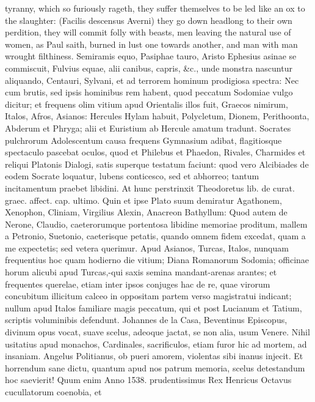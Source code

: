 {tyranny, which so furiously rageth, they suffer themselves to be led
like an ox to the slaughter: (Facilis descensus Averni) they go down
headlong to their own perdition, they will commit folly with beasts,
men leaving the natural use of women, as Paul saith, burned in
lust one towards another, and man with man wrought filthiness.
Semiramis equo, Pasiphae tauro, Aristo Ephesius asinae se commiscuit,
Fulvius equae, alii canibus, capris, \&c., unde monstra nascuntur
aliquando, Centauri, Sylvani, et ad terrorem hominum prodigiosa
spectra: Nec cum brutis, sed ipsis hominibus rem habent, quod peccatum
Sodomiae vulgo dicitur; et frequens olim vitium apud Orientalis illos
fuit, Graecos nimirum, Italos, Afros, Asianos: Hercules Hylam
habuit, Polycletum, Dionem, Perithoonta, Abderum et Phryga; alii et
Euristium ab Hercule amatum tradunt. Socrates pulchrorum Adolescentum
causa frequens Gymnasium adibat, flagitiosque spectaculo pascebat
oculos, quod et Philebus et Phaedon, Rivales, Charmides et
reliqui Platonis Dialogi, satis superque testatum faciunt: quod
vero Alcibiades de eodem Socrate loquatur, lubens conticesco, sed et
abhorreo; tantum incitamentum praebet libidini. At hunc perstrinxit
Theodoretus lib. de curat. graec. affect. cap. ultimo. Quin et ipse
Plato suum demiratur Agathonem, Xenophon, Cliniam, Virgilius Alexin,
Anacreon Bathyllum: Quod autem de Nerone, Claudio, caeterorumque
portentosa libidine memoriae proditum, mallem a Petronio, Suetonio,
caeterisque petatis, quando omnem fidem excedat, quam a me expectetis;
sed vetera querimur. Apud Asianos, Turcas, Italos, nunquam
frequentius hoc quam hodierno die vitium; Diana Romanorum Sodomia;
officinae horum alicubi apud Turcas,-qui saxis semina mandant-arenas
arantes; et frequentes querelae, etiam inter ipsos conjuges hac de re,
quae virorum concubitum illicitum calceo in oppositam partem verso
magistratui indicant; nullum apud Italos familiare magis peccatum, qui
et post Lucianum et Tatium, scriptis voluminibis defendunt.
Johannes de la Casa, Beventinus Episcopus, divinum opus vocat, suave
scelus, adeoque jactat, se non alia, usum Venere. Nihil usitatius apud
monachos, Cardinales, sacrificulos, etiam furor hic ad mortem, ad
insaniam. Angelus Politianus, ob pueri amorem, violentas sibi
inanus injecit. Et horrendum sane dictu, quantum apud nos patrum
memoria, scelus detestandum hoc saevierit! Quum enim Anno 1538.
prudentissimus Rex Henricus Octavus cucullatorum coenobia, et
}
